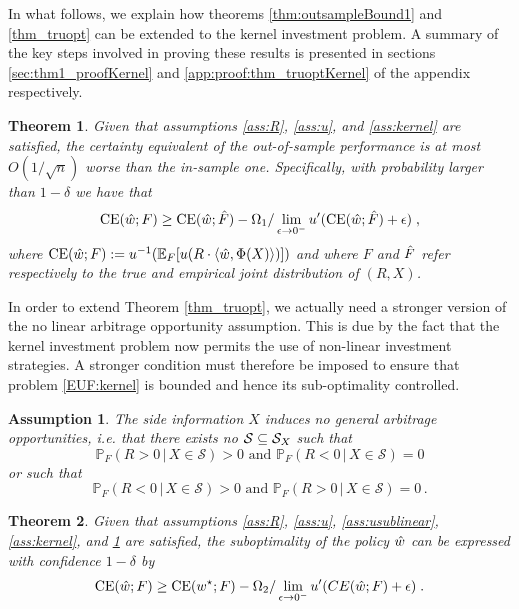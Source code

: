 \documentclass[]{interact}
\theoremstyle{plain}%
\theoremstyle{definition}
\theoremstyle{remark}
\def\Expect{{\mathbb E}}
\def\Prob{{\mathbb P}}
\def\max{\mathop{\rm max}}
\newcommand{\0}{\V{0}}
\newcommand{\1}{\V{1}}
\def\CE{\mathop{\rm CE}}
\theoremstyle{plain}
\newtheorem{thm}{Theorem}
\newtheorem{assumption}{Assumption}
\theoremstyle{definition}
\begin{document}
In what follows, we explain how theorems \ref{thm:outsampleBound1} and \ref{thm_truopt} can be extended to the kernel investment problem. A summary of the key steps involved in proving these results is presented in sections \ref{sec:thm1_proofKernel} and \ref{app:proof:thm_truoptKernel} of the appendix respectively.

\begin{thm}\label{thm:outsampleBound1:kernel}
  Given that assumptions \ref{ass:R}, \ref{ass:u}, and \ref{ass:kernel} are satisfied, the
  certainty equivalent of the out-of-sample performance is at most $O(1/\sqrt{n})$ worse
  than the in-sample one. Specifically, with probability larger than $1-\delta$ we have that
  \[ 
    \CE(\kqhat;\F) \geq \CE(\kqhat;\Fhat) -
    \Omega_1/\lim_{\epsilon\to0^-}u'(\CE(\kqhat;\Fhat)+\epsilon)\;,
 \]
  where $\CE(\kqhat;\F):=u^{-1}(\Expect_\F[u(R\cdot \langle \kqhat, \Phi(X)\rangle)])$ and where $F$ and ${\hat{F}}$ refer respectively to the true and empirical joint distribution of $(R,X)$.
\end{thm}

In order to extend Theorem \ref{thm_truopt}, we actually need a stronger version of the no linear arbitrage opportunity assumption. This is due by the fact that the kernel investment problem now permits the use of non-linear investment strategies. A stronger condition must therefore be imposed to ensure that problem \eqref{EUF:kernel} is bounded and hence its sub-optimality controlled.

\begin{assumption}\label{ass:arbitrageKernel}
  The side information $X$ induces no general arbitrage opportunities, i.e. that there exists no $\mathcal{S}\subseteq {\mathcal{S}_X}$ such that 
\[\Prob_F(R>0 \,|\, X\in\mathcal{S})>0 \mbox{  and  } \Prob_F(R<0 \,|\, X\in\mathcal{S}) = 0\]
or  such that
\[\Prob_F(R<0 \,|\, X\in\mathcal{S})>0 \mbox{  and  } \Prob_F(R>0 \,|\, X\in\mathcal{S}) = 0\,.\]
\end{assumption}

\begin{thm}
  \label{thm_truoptKernel}
  Given that assumptions \ref{ass:R}, \ref{ass:u}, \ref{ass:usublinear}, \ref{ass:kernel}, and \ref{ass:arbitrageKernel} are satisfied, the  suboptimality of the policy ${\hat{w}}$ can be expressed with confidence $1-\delta$ by
  \[  \CE(\kqhat;F) \geq \CE(\kq^\star;F) - \Omega_2/\lim_{\epsilon\to0^{-}}u'(CE(\kqhat;F)+\epsilon)\;.  \]
\end{thm}
\end{document}
